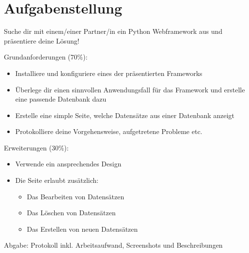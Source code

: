 
\section{Aufgabenstellung}

Suche dir mit einem/einer Partner/in ein Python Webframework aus und präsentiere deine Lösung!

Grundanforderungen (70\%):

\begin{itemize}
	\item Installiere und konfiguriere eines der präsentierten Frameworks
	\item Überlege dir einen sinnvollen Anwendungsfall für das Framework und erstelle eine passende Datenbank dazu
	\item Erstelle eine simple Seite, welche Datensätze aus einer Datenbank anzeigt
	\item Protokolliere deine Vorgehensweise, aufgetretene Probleme etc.
\end{itemize}

Erweiterungen (30\%):

\begin{itemize}
	\item Verwende ein ansprechendes Design
	\item Die Seite erlaubt zusätzlich:
	\begin{itemize}
		\item Das Bearbeiten von Datensätzen
		\item Das Löschen von Datensätzen
		\item Das Erstellen von neuen Datensätzen
	\end{itemize}
\end{itemize}

Abgabe: Protokoll inkl. Arbeitsaufwand, Screenshots und Beschreibungen

\clearpage
